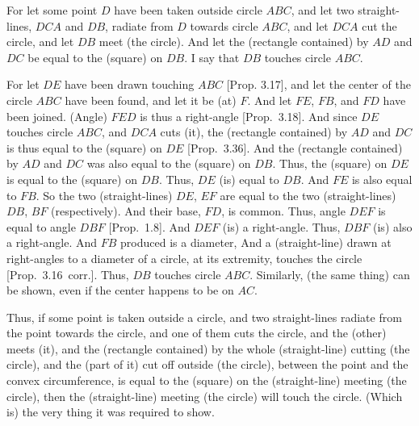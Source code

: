 \epsfysize=1.75in
\centerline{}

For let some point $D$ have been taken outside circle $ABC$, and let two
straight-lines, $DCA$ and $DB$, radiate from $D$ towards circle $ABC$, and
let $DCA$ cut the circle, and let $DB$ meet (the circle). And let the (rectangle
contained) by $AD$ and $DC$ be equal to the (square) on $DB$. I say that $DB$ touches circle $ABC$.

For let $DE$ have been drawn touching $ABC$ [Prop. 3.17], and let the center of the circle
$ABC$ have been found, and let it be (at) $F$. And let $FE$, $FB$, and $FD$ have
been joined. (Angle) $FED$ is thus a right-angle [Prop.~3.18].
And since $DE$ touches circle $ABC$, and $DCA$ cuts (it), the (rectangle contained) by $AD$ and $DC$ is thus equal to the (square) on $DE$ [Prop.~3.36]. And the (rectangle contained) by $AD$ and $DC$ was also equal
to the (square) on $DB$.  Thus, the (square) on $DE$ is equal to the
(square) on $DB$. Thus, $DE$ (is) equal to $DB$. And $FE$ is also equal to
$FB$. So the two (straight-lines) $DE$, $EF$ are equal to the two (straight-lines)
$DB$, $BF$ (respectively).  And their base, $FD$, is common. Thus, angle $DEF$ is equal to
angle $DBF$ [Prop.~1.8]. And $DEF$ (is) a right-angle. Thus, $DBF$
(is) also a right-angle. And $FB$ produced is a diameter, And a (straight-line)
drawn at right-angles to a diameter of a circle, at its extremity, touches the
circle [Prop.~3.16~corr.]. Thus, $DB$ touches circle $ABC$. 
Similarly, (the same thing) can be shown, even if the center happens to be
on $AC$.

Thus, if some point is taken outside a circle, and two straight-lines radiate
from the point towards the circle, and one of them cuts the circle, and the
(other) meets (it), and the (rectangle contained) by the whole (straight-line)
cutting (the circle), and the (part of it) 
cut off outside (the circle),
between the point and the convex circumference,  is equal to the (square)
on the (straight-line) meeting (the circle), then the (straight-line)
meeting (the circle) will touch the circle. (Which is) the very thing it was
required to show.
